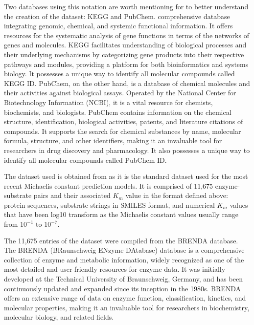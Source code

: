 Two databases using this notation are worth mentioning for to better understand the creation of the dataset:
KEGG and PubChem. %
comprehensive database integrating genomic, chemical, and systemic functional information. 
It offers resources for the systematic analysis of gene functions in terms of the networks of 
genes and molecules. KEGG facilitates understanding of biological processes and their underlying 
mechanisms by categorizing gene products into their respective pathways and modules, providing a 
platform for both bioinformatics and systems biology. It possesses a unique way to identify all molecular
compounds called KEGG ID.
PubChem, on the other hand, is a database of chemical molecules and their activities 
against biological assays. Operated by the National Center for Biotechnology Information (NCBI), 
it is a vital resource for chemists, biochemists, and biologists. 
PubChem contains information on the chemical structure, identification, biological activities, 
patents, and literature citations of compounds. It supports the search for chemical substances 
by name, molecular formula, structure, and other identifiers, making it an invaluable tool for 
researchers in drug discovery and pharmacology. It also possesses a unique way to identify all molecular
compounds called PubChem ID.

The dataset used is obtained from \citeauthor{km1} as it is the standard dataset used for the most recent Michaelis
constant prediction models. It is comprised of 11,675 enzyme-substrate pairs and their associated $K_m$ value in
the format defined above: protein sequences, substrate strings in SMILES format, and numerical $K_m$ values
that have been log10 transform as the Michaelis constant values usually range from $10^{-1}$ to  $10^{-7}$.

The 11,675 entries of the dataset were compiled from the BRENDA database. \cite{brenda} The BRENDA 
(BRaunschweig ENzyme DAtabase) database is a comprehensive collection of 
enzyme and metabolic information, widely recognized as one of the most detailed 
and user-friendly resources for enzyme data. It was initially developed at the Technical 
University of Braunschweig, Germany, and has been continuously updated and expanded since its 
inception in the 1980s. BRENDA offers an extensive range of data on enzyme function, 
classification, kinetics, and molecular properties, making it an invaluable tool for 
researchers in biochemistry, molecular biology, and related fields.

